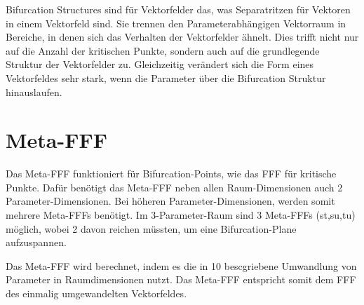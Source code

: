 \documentclass[11pt]{article}
\begin{document}
Bifurcation Structures sind für Vektorfelder das, was Separatritzen für Vektoren in einem Vektorfeld sind. Sie trennen den Parameterabhängigen Vektorraum in Bereiche, in denen sich das Verhalten der Vektorfelder ähnelt. Dies trifft nicht nur auf die Anzahl der kritischen Punkte, sondern auch auf die grundlegende Struktur der Vektorfelder zu. Gleichzeitig verändert sich die Form eines Vektorfeldes sehr stark, wenn die Parameter über die Bifurcation Struktur hinauslaufen.

\section{Meta-FFF}
Das Meta-FFF funktioniert für Bifurcation-Points, wie das FFF für kritische Punkte.
Dafür benötigt das Meta-FFF neben allen Raum-Dimensionen auch 2 Parameter-Dimensionen.
Bei höheren Parameter-Dimensionen, werden somit mehrere Meta-FFFs benötigt.
Im 3-Parameter-Raum sind 3 Meta-FFFs (st,su,tu) möglich, wobei 2 davon reichen müssten, um eine Bifurcation-Plane aufzuspannen.

Das Meta-FFF wird berechnet, indem es die in 10 bescgriebene Umwandlung von Parameter in Raumdimensionen nutzt.
Das Meta-FFF entspricht somit dem FFF des einmalig umgewandelten Vektorfeldes.
\end{document}
